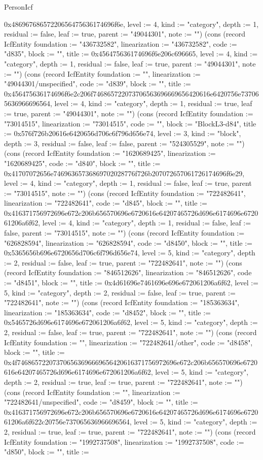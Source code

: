 \begin{lexlean}{PersonIcf}
\begin{semanticmodule}
{0x48696768657220656475636174696f6e, level := 4, kind := "category", depth := 1, residual := false, leaf := true, parent := "49044301", note := ""}) (cons (record IcfEntity {foundation := "436732582", linearization := "436732582", code := "d835", block := "", title := 0x456475636174696f6e206c696665, level := 4, kind := "category", depth := 1, residual := false, leaf := true, parent := "49044301", note := ""}) (cons (record IcfEntity {foundation := "", linearization := "49044301/unspecified", code := "d839", block := "", title := 0x456475636174696f6e2c206f746865722073706563696669656420616e6420756e737065636966696564, level := 4, kind := "category", depth := 1, residual := true, leaf := true, parent := "49044301", note := ""}) (cons (record IcfEntity {foundation := "73014515", linearization := "73014515", code := "", block := "BlockL3-d84", title := 0x576f726b20616e6420656d706c6f796d656e74, level := 3, kind := "block", depth := 3, residual := false, leaf := false, parent := "524305529", note := ""}) (cons (record IcfEntity {foundation := "1620689425", linearization := "1620689425", code := "d840", block := "", title := 0x41707072656e74696365736869702028776f726b207072657061726174696f6e29, level := 4, kind := "category", depth := 1, residual := false, leaf := true, parent := "73014515", note := ""}) (cons (record IcfEntity {foundation := "722482641", linearization := "722482641", code := "d845", block := "", title := 0x416371756972696e672c206b656570696e6720616e64207465726d696e6174696e672061206a6f62, level := 4, kind := "category", depth := 1, residual := false, leaf := false, parent := "73014515", note := ""}) (cons (record IcfEntity {foundation := "626828594", linearization := "626828594", code := "d8450", block := "", title := 0x5365656b696e6720656d706c6f796d656e74, level := 5, kind := "category", depth := 2, residual := false, leaf := true, parent := "722482641", note := ""}) (cons (record IcfEntity {foundation := "846512626", linearization := "846512626", code := "d8451", block := "", title := 0x4d61696e7461696e696e672061206a6f62, level := 5, kind := "category", depth := 2, residual := false, leaf := true, parent := "722482641", note := ""}) (cons (record IcfEntity {foundation := "185363634", linearization := "185363634", code := "d8452", block := "", title := 0x5465726d696e6174696e672061206a6f62, level := 5, kind := "category", depth := 2, residual := false, leaf := true, parent := "722482641", note := ""}) (cons (record IcfEntity {foundation := "", linearization := "722482641/other", code := "d8458", block := "", title := 0x4f746865722073706563696669656420616371756972696e672c206b656570696e6720616e64207465726d696e6174696e672061206a6f62, level := 5, kind := "category", depth := 2, residual := true, leaf := true, parent := "722482641", note := ""}) (cons (record IcfEntity {foundation := "", linearization := "722482641/unspecified", code := "d8459", block := "", title := 0x416371756972696e672c206b656570696e6720616e64207465726d696e6174696e672061206a6f622c20756e737065636966696564, level := 5, kind := "category", depth := 2, residual := true, leaf := true, parent := "722482641", note := ""}) (cons (record IcfEntity {foundation := "1992737508", linearization := "1992737508", code := "d850", block := "", title := }
\end{semanticmodule}
\end{lexlean}
